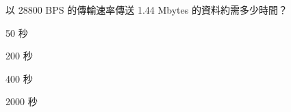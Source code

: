 \ifx\ntpcNinetyTwo\undefined[92學年基北區] \fi
以 28800 BPS 的傳輸速率傳送 1.44 Mbytes 的資料約需多少時間？
  \begin{optionlist}
  \item 50 秒\label{ntpc-92-a22}
  \item 200 秒
  \item 400 秒
  \item 2000 秒
  \end{optionlist}